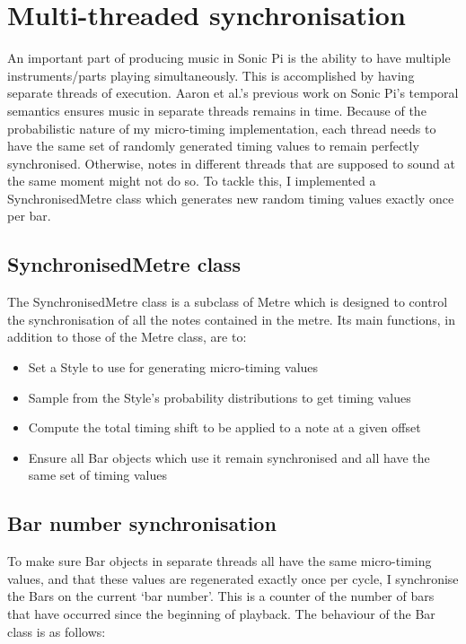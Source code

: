 \documentclass[12pt,twoside,openright]{report}
\begin{document}
\section{Multi-threaded synchronisation} \label{multi-threaded_synchronisation}

An important part of producing music in Sonic Pi is the ability to have multiple
instruments/parts playing simultaneously. This is accomplished by having
separate threads of execution. Aaron et al.'s previous work on Sonic Pi's
temporal semantics \cite{aaron2014} ensures music in separate threads remains in time.
Because of the probabilistic nature of my micro-timing implementation, each
thread needs to have the same set of randomly generated timing values to remain
perfectly synchronised. Otherwise, notes in different threads that are supposed
to sound at the same moment might not do so. To tackle this, I implemented a
SynchronisedMetre class which generates new random timing values exactly once
per bar.


\subsection{SynchronisedMetre class} \label{synchronised_metre}

The SynchronisedMetre class is a subclass of Metre which is designed to control
the synchronisation of all the notes contained in the metre. Its main functions,
in addition to those of the Metre class, are to:
\begin{itemize}
	\item Set a Style to use for generating micro-timing values
	\item Sample from the Style's probability distributions to get timing values
	\item Compute the total timing shift to be applied to a note at a given offset
	\item Ensure all Bar objects which use it remain synchronised and all have the same set of timing values
\end{itemize}


\subsection{Bar number synchronisation} \label{bar_number_synchronisation}

To make sure Bar objects in separate threads all have the same micro-timing
values, and that these values are regenerated exactly once per cycle, I
synchronise the Bars on the current `bar number'. This is a counter of the
number of bars that have occurred since the beginning of playback. The behaviour
of the Bar class is as follows:
\end{document}
